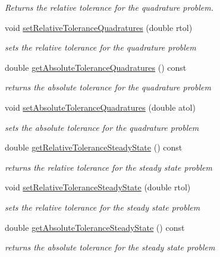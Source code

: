 \begin{DoxyCompactItemize}
\begin{DoxyCompactList}\small\item\em Returns the relative tolerance for the quadrature problem. \end{DoxyCompactList}\item 
void \mbox{\hyperlink{classamici_1_1_solver_a086428d30274f2b7e6f94e8e7593dd8b}{set\+Relative\+Tolerance\+Quadratures}} (double rtol)
\begin{DoxyCompactList}\small\item\em sets the relative tolerance for the quadrature problem \end{DoxyCompactList}\item 
double \mbox{\hyperlink{classamici_1_1_solver_a1f50a4e21784c2757530068483c405cb}{get\+Absolute\+Tolerance\+Quadratures}} () const
\begin{DoxyCompactList}\small\item\em returns the absolute tolerance for the quadrature problem \end{DoxyCompactList}\item 
void \mbox{\hyperlink{classamici_1_1_solver_af425163c5d98c472d17e080da4ee3b78}{set\+Absolute\+Tolerance\+Quadratures}} (double atol)
\begin{DoxyCompactList}\small\item\em sets the absolute tolerance for the quadrature problem \end{DoxyCompactList}\item 
double \mbox{\hyperlink{classamici_1_1_solver_ae598de1a48d3c4af1d08b8436d481e11}{get\+Relative\+Tolerance\+Steady\+State}} () const
\begin{DoxyCompactList}\small\item\em returns the relative tolerance for the steady state problem \end{DoxyCompactList}\item 
void \mbox{\hyperlink{classamici_1_1_solver_abdc290e52ae8a037aa65648f044c1ab5}{set\+Relative\+Tolerance\+Steady\+State}} (double rtol)
\begin{DoxyCompactList}\small\item\em sets the relative tolerance for the steady state problem \end{DoxyCompactList}\item 
double \mbox{\hyperlink{classamici_1_1_solver_adbb1549f9762649455bde39c29d47a03}{get\+Absolute\+Tolerance\+Steady\+State}} () const
\begin{DoxyCompactList}\small\item\em returns the absolute tolerance for the steady state problem \end{DoxyCompactList}\item 

\end{DoxyCompactItemize}

